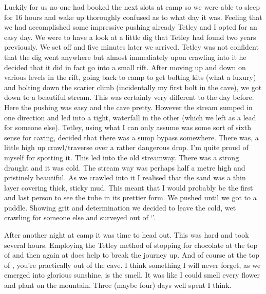Luckily for us no-one had booked the next slots at camp so we were able to sleep for 16 hours and wake up thoroughly confused as to what day it was. Feeling that we had accomplished some impressive pushing already Tetley and I opted for an easy day. We were to have a look at a little dig that Tetley had found two years previously. We set off and five minutes later we arrived. Tetley was not confident that the dig went anywhere but almost immediately upon crawling into it he decided that it did in fact go into a small rift. After moving up and down on various levels in the rift, going back to camp to get bolting kits (what a luxury) and bolting down the scarier climb (incidentally my first bolt in the cave), we got down to a beautiful stream. This was certainly very different to the day before. Here the pushing was easy and the cave pretty. However the stream sumped in one direction and led into a tight, waterfall in the other (which we left as a lead for someone else). Tetley, using what I can only assume was some sort of sixth sense for caving, decided that there was a sump bypass somewhere. There was, a little high up crawl/traverse over a rather dangerous drop. I’m quite proud of myself for spotting it. This led into the old streamway. There was a strong draught and it was cold. The stream way was perhaps half a metre high and pristinely beautiful. As we crawled into it I realised that the sand was a thin layer covering thick, sticky mud. This meant that I would probably be the first and last person to see the tube in its prettier form. We pushed until we got to a puddle. Showing grit and determination we decided to leave the cold, wet crawling for someone else and surveyed out of ‘’.

After another night at camp it was time to head out. This was hard and took several hours. Employing the Tetley method of stopping for chocolate at the top of  and then again at  does help to break the journey up. And of course at the top of , you’re practically out of the cave. I think something I will never forget, as we emerged into glorious sunshine, is the smell. It was like I could smell every flower and plant on the mountain. Three (maybe four) days well spent I think.

